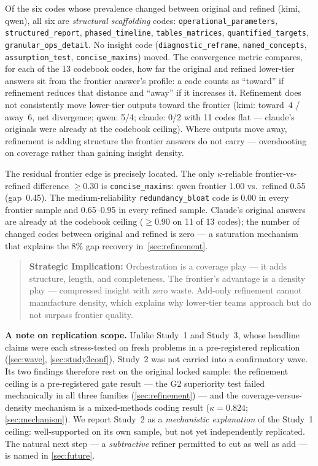 \documentclass[12pt,a4paper]{article}
\begin{document}
Of the six codes whose prevalence changed between original and refined (kimi,
qwen), all six are \emph{structural scaffolding} codes:
\texttt{operational\_parameters}, \texttt{structured\_report},
\texttt{phased\_timeline}, \texttt{tables\_matrices},
\texttt{quantified\_targets}, \texttt{granular\_ops\_detail}. No insight code
(\texttt{diagnostic\_reframe}, \texttt{named\_concepts},
\texttt{assumption\_test}, \texttt{concise\_maxims}) moved. The convergence metric compares, for each of the 13 codebook codes, how far
the original and refined lower-tier answers sit from the frontier answer's
profile: a code counts as ``toward'' if refinement reduces that distance and
``away'' if it increases it. Refinement does not consistently move lower-tier
outputs toward the frontier (kimi: toward~4 / away~6, net divergence; qwen:
5/4; claude: 0/2 with 11 codes flat --- claude's originals were already at the
codebook ceiling). Where outputs move away, refinement is adding structure the
frontier answers do not carry --- overshooting on coverage rather than gaining
insight density.

The residual frontier edge is precisely located. The only $\kappa$-reliable
frontier-vs-refined difference $\ge 0.30$ is \texttt{concise\_maxims}: qwen
frontier 1.00 vs.\ refined 0.55 (gap~0.45). The medium-reliability
\texttt{redundancy\_bloat} code is 0.00 in every frontier sample and 0.65--0.95
in every refined sample. Claude's original answers are already at the codebook
ceiling ($\ge 0.90$ on 11 of 13 codes); the number of changed codes between
original and refined is zero --- a saturation mechanism that explains the 8\%
gap recovery in~\cref{sec:refinement}.

\begin{quote}
\textbf{Strategic Implication:} Orchestration is a coverage play --- it adds
structure, length, and completeness. The frontier's advantage is a density
play --- compressed insight with zero waste. Add-only refinement cannot
manufacture density, which explains why lower-tier teams approach but do not surpass
frontier quality.
\end{quote}

\textbf{A note on replication scope.} Unlike Study~1 and Study~3, whose headline
claims were each stress-tested on fresh problems in a pre-registered replication
(\cref{sec:wave}, \cref{sec:study3conf}), Study~2 was not carried into a
confirmatory wave. Its two findings therefore rest on the original locked
sample: the refinement ceiling is a pre-registered gate result --- the G2
superiority test failed mechanically in all three families
(\cref{sec:refinement}) --- and the coverage-versus-density mechanism is a
mixed-methods coding result ($\kappa = 0.824$; \cref{sec:mechanism}). We report
Study~2 as a \emph{mechanistic explanation} of the Study~1 ceiling:
well-supported on its own sample, but not yet independently replicated. The
natural next step --- a \emph{subtractive} refiner permitted to cut as well as
add --- is named in \cref{sec:future}.
\end{document}
